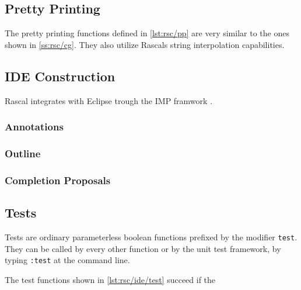 \subsection{Pretty Printing}

The pretty printing functions defined in \autoref{lst:rsc/pp} are very similar to the ones shown in \autoref{ss:rsc/cg}.
They also utilize Rascals string interpolation capabilities.




\subsection{IDE Construction}

Rascal integrates with Eclipse trough the IMP framwork \cite{van2011rascal}.




\subsubsection{Annotations}



\subsubsection{Outline}



\subsubsection{Completion Proposals}



\subsection{Tests}

Tests are ordinary parameterless boolean functions prefixed by the modifier \lstinline[language=rascal]{test}.
They can be called by every other function or by the unit test framework, by typing \texttt{:test} at the command line.

The test functions shown in \autoref{lst:rsc/ide/test} succeed if the 


